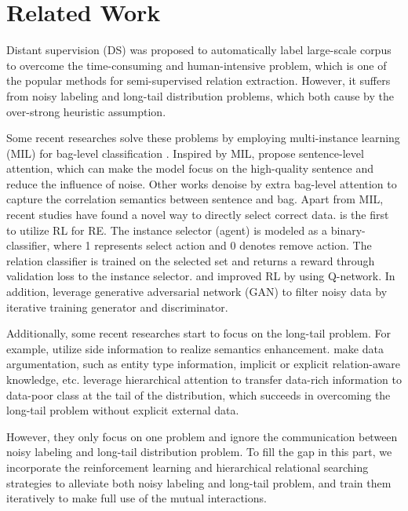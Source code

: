 \documentclass{article}
\begin{document}
\section{Related Work}

Distant supervision (DS) \cite{mintz2009distant} was proposed to automatically label large-scale corpus to overcome the time-consuming and human-intensive problem, which is one of the popular methods for semi-supervised relation extraction. However, it suffers from noisy labeling and long-tail distribution problems, which both cause by the over-strong heuristic assumption. 

Some recent researches solve these problems by employing multi-instance learning (MIL) for bag-level classification \cite{riedel2010modeling,hoffmann2011knowledge}. Inspired by MIL, \cite{Jat2018Improving,Lin2016Neural,Zeng2015Distant,ji2017distant} propose sentence-level attention, which can make the model focus on the high-quality sentence and reduce the influence of noise. Other works \cite{yuan2019cross-relation} denoise by extra bag-level attention to capture the correlation semantics between sentence and bag. Apart from MIL, recent studies have found a novel way to directly select correct data. \cite{Feng2018Reinforcement} is the first to utilize RL for RE. The instance selector (agent) is modeled as a binary-classifier, where 1 represents select action and 0 denotes remove action. The relation classifier is trained on the selected set and returns a reward through validation loss to the instance selector.  \cite{he2019improving} and \cite{Qin2018Robust} improved RL by using Q-network. In addition, \cite{Qin2018DSGAN,Han2018Denoising} leverage generative adversarial network (GAN) to filter noisy data by iterative training generator and discriminator. 

Additionally, some recent researches start to focus on the long-tail problem. For example, \cite{Vashishth2018RESIDE,li2019self-attention,xu2019connecting} utilize side information to realize semantics enhancement. \cite{beltagy2019combining} make data argumentation, such as entity type information, implicit or explicit relation-aware knowledge, etc. \cite{zhang2019long-tail,han2018hierarchical} leverage hierarchical attention to transfer data-rich information to data-poor class at the tail of the distribution, which succeeds in overcoming the long-tail problem without explicit external data. 

However, they only focus on one problem and ignore the communication between noisy labeling and long-tail distribution problem. To fill the gap in this part, we incorporate the reinforcement learning and hierarchical relational searching strategies to alleviate both noisy labeling and long-tail problem, and train them iteratively to make full use of the mutual interactions.
\end{document}
